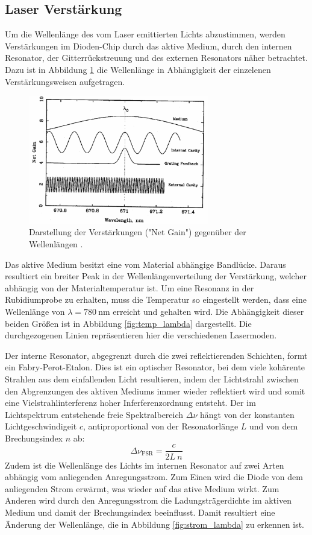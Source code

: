 \subsection{Laser Verstärkung}
Um die Wellenlänge des vom Laser emittierten Lichts abzustimmen, werden Verstärkungen im
Dioden-Chip durch das aktive Medium, durch den internen Resonator, der Gitterrückstreuung
und des externen Resonators näher betrachtet. Dazu ist in Abbildung \ref{fig:net_gain}
die Wellenlänge in Abhängigkeit der einzelenen Verstärkungsweisen aufgetragen.
\begin{figure}[htb]
  \centering
  \includegraphics[width=0.7\textwidth, angle=1, origin=c]{images/gain-lambda.pdf}
  \caption{Darstellung der Verstärkungen ("Net Gain") gegenüber der Wellenlängen
  \cite{anleitung}.}
  \label{fig:net_gain}
\end{figure}

Das aktive Medium besitzt eine vom Material abhängige Bandlücke. Daraus resultiert
ein breiter Peak in der Wellenlängenverteilung der Verstärkung, welcher abhängig von der
Materialtemperatur ist. Um eine Resonanz in der Rubidiumprobe zu erhalten, muss
die Temperatur so eingestellt werden, dass eine Wellenlänge von $\lambda = \SI{780}{\nano\meter}$
erreicht und gehalten wird. Die Abhängigkeit dieser beiden Größen ist in Abbildung
\ref{fig:temp_lambda} dargestellt. Die durchgezogenen Linien repräsentieren hier
die verschiedenen Lasermoden.

Der interne Resonator, abgegrenzt durch die zwei reflektierenden Schichten, formt ein
Fabry-Perot-Etalon. Dies ist ein optischer Resonator, bei dem viele kohärente Strahlen
aus dem einfallenden Licht resultieren, indem der Lichtstrahl zwischen den
Abgrenzungen des aktiven Mediums immer wieder reflektiert wird und somit eine
Vielstrahlinterferenz hoher Inferferenzordnung entsteht. Der im Lichtspektrum
entstehende freie Spektralbereich $\Delta\nu$ hängt von der konstanten Lichtgeschwindigeit $c$,
antiproportional von der Resonatorlänge $L$ und von dem Brechungsindex $n$ ab:
\begin{equation}
  \Delta\nu_\text{FSR} = \frac{c}{2L\:n}
\end{equation}
Zudem ist die Wellenlänge des Lichts im internen Resonator auf zwei Arten abhängig
vom anliegenden Anregungsstrom. Zum Einen wird die Diode von dem anliegenden Strom
erwärmt, was wieder auf das ative Medium wirkt. Zum Anderen wird durch den Anregungsstrom
die Ladungsträgerdichte im aktiven Medium und damit der Brechungsindex beeinflusst.
Damit resultiert eine Änderung der Wellenlänge, die in Abbildung \ref{fig:strom_lambda}
zu erkennen ist.

